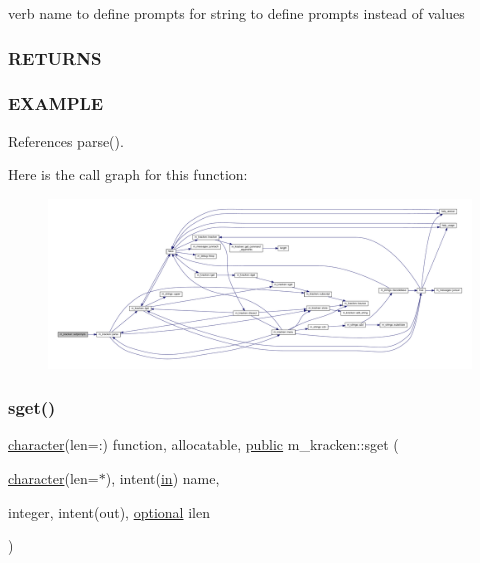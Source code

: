 verb name to define prompts for string to define prompts instead of values \subsubsection*{R\+E\+T\+U\+R\+NS}

\subsubsection*{E\+X\+A\+M\+P\+LE}

References parse().

Here is the call graph for this function\+:
\nopagebreak
\begin{figure}[H]
\begin{center}
\leavevmode
\includegraphics[width=350pt]{namespacem__kracken_aab831b470a3107ca69833e717e95eaec_cgraph}
\end{center}
\end{figure}
\mbox{\label{namespacem__kracken_a9a64192326816b0b9badcc11506628ee}} 
\subsubsection{\texorpdfstring{sget()}{sget()}}
{\footnotesize\ttfamily \hyperlink{option__stopwatch_83_8txt_abd4b21fbbd175834027b5224bfe97e66}{character}(len=\+:) function, allocatable, \hyperlink{M__stopwatch_83_8txt_a2f74811300c361e53b430611a7d1769f}{public} m\+\_\+kracken\+::sget (\begin{DoxyParamCaption}\item[{\hyperlink{option__stopwatch_83_8txt_abd4b21fbbd175834027b5224bfe97e66}{character}(len=$\ast$), intent(\hyperlink{M__journal_83_8txt_afce72651d1eed785a2132bee863b2f38}{in})}]{name,  }\item[{integer, intent(out), \hyperlink{option__stopwatch_83_8txt_aa4ece75e7acf58a4843f70fe18c3ade5}{optional}}]{ilen }\end{DoxyParamCaption})}



